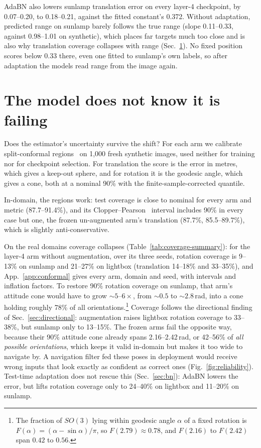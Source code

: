 \documentclass{article}
\begin{document}
AdaBN also lowers sunlamp translation error on every layer-4 checkpoint, by 0.07--0.20, to
0.18--0.21, against the fitted constant's 0.372. Without adaptation, predicted range on sunlamp
barely follows the true range (slope 0.11--0.33, against 0.98--1.01 on synthetic), which places
far targets much too close and is also why translation coverage collapses with range
(Sec.~\ref{sec:conformal}). No fixed position scores below 0.33 there, even one fitted to
sunlamp's own labels, so after adaptation the models read range from the image again.


\section{The model does not know it is failing}
\label{sec:conformal}

Does the estimator's uncertainty survive the shift? For each arm we calibrate split-conformal
regions~\citep{vovk2005algorithmic,lei2018distribution,angelopoulos2023gentle} on 1{,}000 fresh
synthetic images, used neither for training nor for checkpoint selection. For translation the
score is the error in metres, which gives a keep-out sphere, and for rotation it is the
geodesic angle, which gives a cone, both at a nominal 90\% with the finite-sample-corrected
quantile.

In-domain, the regions work: test coverage is close to nominal for every arm and metric
(87.7--91.4\%), and its Clopper--Pearson~\citep{clopper1934use} interval includes 90\% in every
case but one, the frozen un-augmented arm's translation (87.7\%, 85.5--89.7\%), which is
slightly anti-conservative.

On the real domains coverage collapses (Table~\ref{tab:coverage-summary}): for the layer-4 arm without augmentation, over its
three seeds, rotation coverage is 9--13\% on sunlamp and 21--27\% on lightbox (translation
14--18\% and 33--35\%), and App.~\ref{app:conformal} gives every arm, domain and seed, with
intervals and inflation factors. To restore 90\% rotation coverage on sunlamp, that arm's
attitude cone would have to grow ${\sim}5$--$6\times$, from ${\sim}0.5$ to ${\sim}2.8$\,rad,
into a cone holding roughly 78\% of all orientations.\footnote{The fraction of $SO(3)$ lying
within geodesic angle $\alpha$ of a fixed rotation is $F(\alpha) = (\alpha - \sin\alpha)/\pi$,
so $F(2.79) \approx 0.78$, and $F(2.16)$ to $F(2.42)$ span $0.42$ to $0.56$.} Coverage follows
the directional finding of Sec.~\ref{sec:directional}: augmentation raises lightbox rotation
coverage to 33--38\%, but sunlamp only to 13--15\%. The frozen arms fail the opposite way,
because their 90\% attitude cone already spans 2.16--2.42\,rad, or 42--56\% of \emph{all
possible orientations}, which keeps it valid in-domain but makes it too wide to navigate by. A
navigation filter fed these
poses in deployment would receive wrong inputs that look exactly as confident as correct ones
(Fig.~\ref{fig:reliability}). Test-time adaptation does not rescue this
(Sec.~\ref{sec:bn}): AdaBN lowers the error, but lifts rotation coverage only to 24--40\% on
lightbox and 11--20\% on sunlamp.
\end{document}
